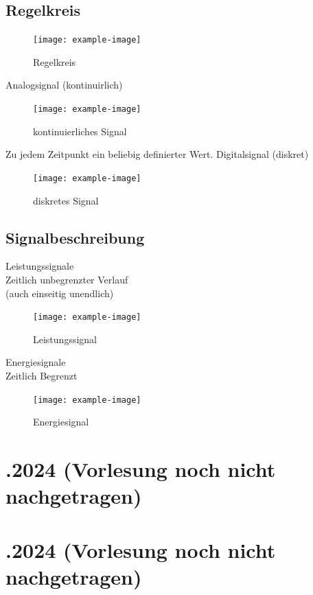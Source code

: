\documentclass{article}
\begin{document}
\subsection{Regelkreis}
\begin{figure}[!ht]
	\centering
	\texttt{[image: example-image]}
	\caption{Regelkreis}\label{Abb. Regelkreis}
\end{figure}

\begin{paracol}{2}
	{\large Analogsignal (kontinuirlich)}
	\begin{figure}[!ht]
		\centering
		\texttt{[image: example-image]}
		\caption{kontinuierliches Signal}\label{Abb. kontinuierliches Signal}
	\end{figure}
	Zu jedem Zeitpunkt ein beliebig definierter Wert.
	\switchcolumn
	Digitalsignal (diskret)
	\begin{figure}[!ht]
		\centering
		\texttt{[image: example-image]}
		\caption{diskretes Signal}\label{Abb. diskretes Signal}
	\end{figure}
\end{paracol}

\subsection{Signalbeschreibung}
\begin{paracol}{2}
	{\large Leistungssignale} \\
	Zeitlich unbegrenzter Verlauf \\
	(auch einseitig unendlich)
	\begin{figure}[!ht]
		\centering
		\texttt{[image: example-image]}
		\caption{Leistungssignal}\label{Abb. Leistungssignal}
	\end{figure}
	\switchcolumn
	{\large Energiesignale} \\
	Zeitlich Begrenzt
	\begin{figure}[!ht]
		\centering
		\texttt{[image: example-image]}
		\caption{Energiesignal}\label{Abb. Energiesignal}
	\end{figure}
\end{paracol}


\newpage
\section*{.2024 (Vorlesung noch nicht nachgetragen)}
\section*{.2024 (Vorlesung noch nicht nachgetragen)}
\end{document}
